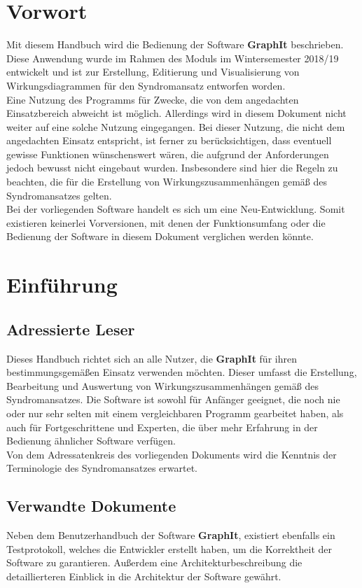 \documentclass[enabledeprecatedfontcommands,fontsize=11pt,paper=a4,twoside]{scrartcl}
\newcounter{one}
\newcounter{two}[one]
\begin{document}
\section*{Vorwort}
Mit diesem Handbuch wird die Bedienung der Software \textbf{GraphIt} beschrieben. Diese Anwendung wurde im Rahmen des Moduls \grqq im Wintersemester 2018/19 entwickelt und ist zur Erstellung, Editierung und Visualisierung von Wirkungsdiagrammen für den Syndromansatz entworfen worden. \\
Eine Nutzung des Programms für Zwecke, die von dem angedachten Einsatzbereich abweicht ist möglich. Allerdings wird in diesem Dokument nicht weiter auf eine solche Nutzung eingegangen. Bei dieser Nutzung, die nicht dem angedachten Einsatz entspricht, ist ferner zu berücksichtigen, dass eventuell gewisse Funktionen wünschenswert wären, die aufgrund der Anforderungen jedoch bewusst nicht eingebaut wurden. Insbesondere sind hier die Regeln zu beachten, die für die Erstellung von Wirkungszusammenhängen gemäß des Syndromansatzes gelten. \\
Bei der vorliegenden Software handelt es sich um eine Neu-Entwicklung. Somit existieren keinerlei Vorversionen, mit denen der Funktionsumfang oder die Bedienung der Software in diesem Dokument verglichen werden könnte. 

\section{Einführung}
\subsection{Adressierte Leser}
Dieses Handbuch richtet sich an alle Nutzer, die \textbf{GraphIt} für ihren bestimmungsgemäßen Einsatz verwenden möchten. Dieser umfasst die Erstellung, Bearbeitung und Auswertung von Wirkungszusammenhängen gemäß des Syndromansatzes. Die Software ist sowohl für Anfänger geeignet, die noch nie oder nur sehr selten mit einem vergleichbaren Programm gearbeitet haben, als auch für Fortgeschrittene und Experten, die über mehr Erfahrung in der Bedienung ähnlicher Software verfügen. \\
Von dem Adressatenkreis des vorliegenden Dokuments wird die Kenntnis der Terminologie des Syndromansatzes erwartet.  
\subsection{Verwandte Dokumente}
Neben dem Benutzerhandbuch der Software \textbf{GraphIt}, existiert ebenfalls ein Testprotokoll, welches die Entwickler erstellt haben, um die Korrektheit der Software zu garantieren. Außerdem eine Architekturbeschreibung die detaillierteren Einblick in die Architektur der Software gewährt. 
\end{document}
